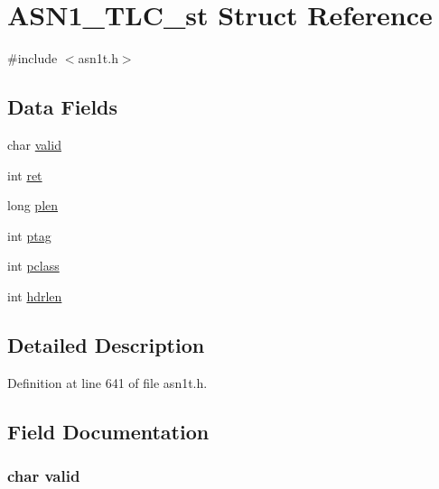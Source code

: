 \hypertarget{struct_a_s_n1___t_l_c__st}{}\section{A\+S\+N1\+\_\+\+T\+L\+C\+\_\+st Struct Reference}
\label{struct_a_s_n1___t_l_c__st}


{\ttfamily \#include $<$asn1t.\+h$>$}

\subsection*{Data Fields}
\begin{DoxyCompactItemize}
\item 
char \hyperlink{struct_a_s_n1___t_l_c__st_a6c12a2a65fbd9052d377c433e605791b}{valid}
\item 
int \hyperlink{struct_a_s_n1___t_l_c__st_a6baa346e44f4c2158d2be4f9b77b8203}{ret}
\item 
long \hyperlink{struct_a_s_n1___t_l_c__st_ab2fd72729381cab9387cd94409b968b3}{plen}
\item 
int \hyperlink{struct_a_s_n1___t_l_c__st_a3301821ad40eb17022e486accba6838d}{ptag}
\item 
int \hyperlink{struct_a_s_n1___t_l_c__st_ad65ce99c604a1e8cc10dcaed2c61d611}{pclass}
\item 
int \hyperlink{struct_a_s_n1___t_l_c__st_aba689c8df7cf733548a05ee5c649fd79}{hdrlen}
\end{DoxyCompactItemize}


\subsection{Detailed Description}


Definition at line 641 of file asn1t.\+h.



\subsection{Field Documentation}
\subsubsection[{\texorpdfstring{valid}{valid}}]{\setlength{\rightskip}{0pt plus 5cm}char valid}\hypertarget{struct_a_s_n1___t_l_c__st_a6c12a2a65fbd9052d377c433e605791b}{}\label{struct_a_s_n1___t_l_c__st_a6c12a2a65fbd9052d377c433e605791b}


